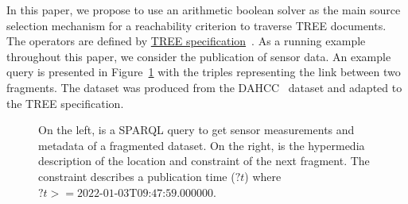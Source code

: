 In this paper, we propose to use an arithmetic boolean solver as the main source selection mechanism for a reachability criterion to traverse TREE documents.
The operators are defined by \href{https://treecg.github.io/specification/}{TREE specification}~.
As a running example throughout this paper, we consider the publication of sensor data.
An example query is presented in Figure~\ref{lst:system} with the triples representing the link between two fragments.
The dataset was produced from the DAHCC~\cite{dahcc_resource} dataset and adapted to the TREE specification.

\begin{figure}[h]
    \begin{minipage}{0.50\textwidth}
        \centering
        
    \end{minipage}
    \hspace{0.05\textwidth}
    \begin{minipage}{0.43\textwidth}
        \centering
        
    \end{minipage}
    \caption{On the left, is a SPARQL query to get sensor measurements and metadata of a fragmented dataset.
    On the right, is the hypermedia description of the location and constraint of the next fragment.
    The constraint describes a publication time ($?t$) where $?t>= \text{2022-01-03T09:47:59.000000}$.}
        \label{lst:system}
\end{figure}